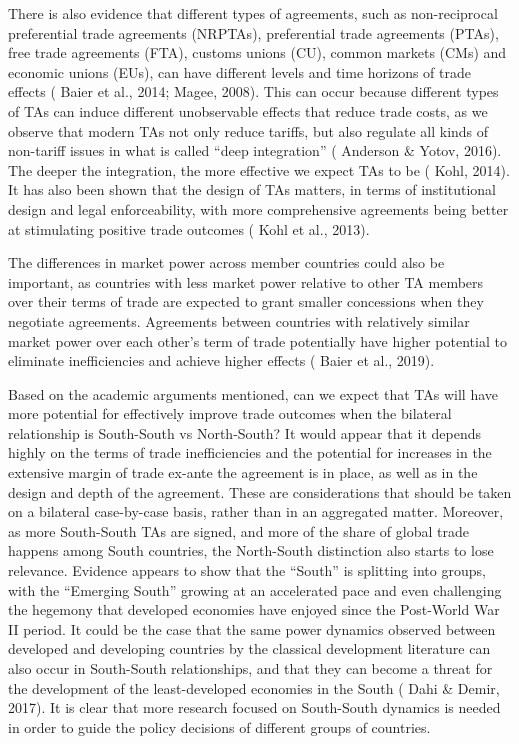 There is also evidence that different types of agreements, such as
non-reciprocal preferential trade agreements (NRPTAs), preferential
trade agreements (PTAs), free trade agreements (FTA), customs unions
(CU), common markets (CMs) and economic unions (EUs), can have different
levels and time horizons of trade effects (\cite{baier_economic_2014} Baier et al., 2014; \cite{magee_new_2008-1} Magee,
2008). This can occur because different types of TAs can induce
different unobservable effects that reduce trade costs, as we observe
that modern TAs not only reduce tariffs, but also regulate all kinds of
non-tariff issues in what is called ``deep integration'' (\cite{anderson_terms_2016} Anderson \&
Yotov, 2016). The deeper the integration, the more effective we expect
TAs to be (\cite{kohl_we_2014} Kohl, 2014). It has also been shown that the design of TAs
matters, in terms of institutional design and legal enforceability, with
more comprehensive agreements being better at stimulating positive trade
outcomes (\cite{kohl_trade_2013} Kohl et al., 2013).

The differences in market power across member countries could also be
important, as countries with less market power relative to other TA
members over their terms of trade are expected to grant smaller
concessions when they negotiate agreements. Agreements between countries
with relatively similar market power over each other's term of trade
potentially have higher potential to eliminate inefficiencies and
achieve higher effects (\cite{baier_widely_2019} Baier et al., 2019).

Based on the academic arguments mentioned, can we expect that TAs will
have more potential for effectively improve trade outcomes when the
bilateral relationship is South-South vs North-South? It would appear
that it depends highly on the terms of trade inefficiencies and the
potential for increases in the extensive margin of trade ex-ante the
agreement is in place, as well as in the design and depth of the
agreement. These are considerations that should be taken on a bilateral
case-by-case basis, rather than in an aggregated matter. Moreover, as more
South-South TAs are signed, and more of the share of global trade
happens among South countries, the North-South distinction also starts
to lose relevance. Evidence appears to show that the ``South'' is
splitting into groups, with the ``Emerging South'' growing at an
accelerated pace and even challenging the hegemony that developed
economies have enjoyed since the Post-World War II period. It could be
the case that the same power dynamics observed between developed and
developing countries by the classical development literature can also occur
in South-South relationships, and that they can become a threat for the
development of the least-developed economies in the South (\cite{dahi_south-south_2017} Dahi \&
Demir, 2017). It is clear that more research focused on South-South
dynamics is needed in order to guide the policy decisions of different
groups of countries.

